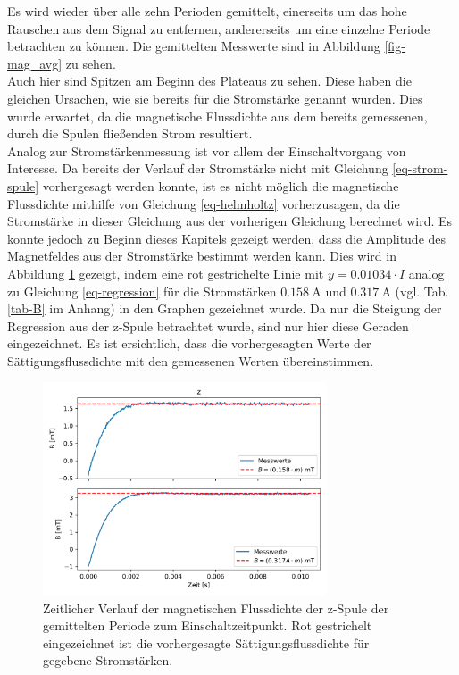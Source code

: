 \documentclass[page,pdftex,12pt,a4paper,twoside,openright]{scrbook}
\begin{document}
Es wird wieder über alle zehn Perioden gemittelt, einerseits um das hohe Rauschen aus dem Signal zu entfernen, andererseits um eine einzelne Periode betrachten zu können. Die gemittelten Messwerte sind in Abbildung \ref{fig-mag_avg} zu sehen.\\

Auch hier sind Spitzen am Beginn des Plateaus zu sehen. Diese haben die gleichen Ursachen, wie sie bereits für die Stromstärke genannt wurden. Dies wurde erwartet, da die magnetische Flussdichte aus dem bereits gemessenen, durch die Spulen fließenden Strom resultiert.\\


Analog zur Stromstärkenmessung ist vor allem der Einschaltvorgang von Interesse. Da bereits der Verlauf der Stromstärke nicht mit Gleichung \ref{eq-strom-spule} vorhergesagt werden konnte, ist es nicht möglich die magnetische Flussdichte mithilfe von Gleichung \ref{eq-helmholtz} vorherzusagen, da die Stromstärke in dieser Gleichung aus der vorherigen Gleichung berechnet wird. Es konnte jedoch zu Beginn dieses Kapitels gezeigt werden, dass die Amplitude des Magnetfeldes aus der Stromstärke bestimmt werden kann. Dies wird in Abbildung \ref{fig-mag_fit} gezeigt, indem eine rot gestrichelte Linie mit \(y = 0.01034 \cdot I\) analog zu Gleichung \ref{eq-regression} für die Stromstärken \(\SI{0.158}{\ampere}\) und \(\SI{0.317}{\ampere}\) (vgl. Tab. \ref{tab-B} im Anhang) in den Graphen gezeichnet wurde. Da nur die Steigung der Regression aus der z-Spule betrachtet wurde, sind nur hier diese Geraden eingezeichnet. Es ist ersichtlich, dass die vorhergesagten Werte der Sättigungsflussdichte mit den gemessenen Werten übereinstimmen.\\

\begin{figure}[!h]
\centering
\includegraphics[width=0.75\textwidth]{img/mag_fit.png}
\caption{\label{fig-mag_fit}
Zeitlicher Verlauf der magnetischen Flussdichte der z-Spule der gemittelten Periode zum Einschaltzeitpunkt. Rot gestrichelt eingezeichnet ist die vorhergesagte Sättigungsflussdichte für gegebene Stromstärken.}
\end{figure}
\end{document}
